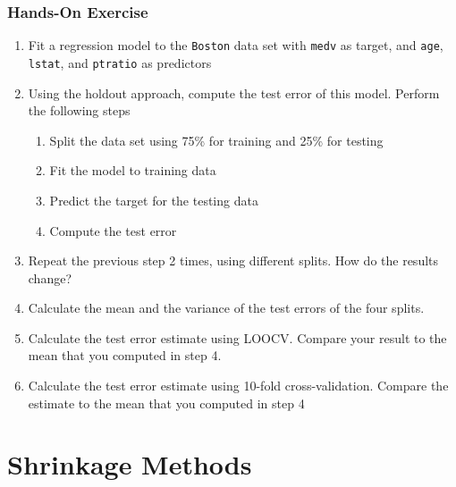 \begin{tcolorbox}[colback=code]
\subsubsection*{Hands-On Exercise} 

\begin{enumerate}
  \item Fit a regression model to the \texttt{Boston} data set with \texttt{medv} as target, and \texttt{age}, \texttt{lstat}, and \texttt{ptratio} as predictors
  \item Using the holdout approach, compute the test error of this model. Perform the following steps
  \begin{enumerate}
     \item Split the data set using 75\% for training and 25\% for testing
     \item Fit the model to training data
     \item Predict the target for the testing data
     \item Compute the test error
  \end{enumerate}
  \item Repeat the previous step 2 times, using different splits. How do the results change?
  \item Calculate the mean and the variance of the test errors of the four splits. 
  \item Calculate the test error estimate using LOOCV. Compare your result to the mean that you computed in step 4.
  \item Calculate the test error estimate using 10-fold cross-validation. Compare the estimate to the mean that you computed in step 4
\end{enumerate}
\end{tcolorbox}

\section{Shrinkage Methods}


